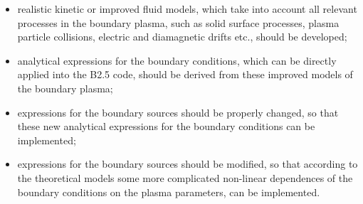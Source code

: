 \documentclass[11pt]{article}
\begin{document}
\begin{itemize}
\item  realistic kinetic or improved fluid models, which take into account
all relevant processes in the boundary plasma, such as solid surface
processes, plasma particle collisions, electric and diamagnetic drifts etc.,
should be developed;

\item  analytical expressions for the boundary conditions, which can be
directly applied into the B2.5 code, should be derived from these improved
models of the boundary plasma;

\item  expressions for the boundary sources should be properly changed, so
that these new analytical expressions for the boundary conditions can be
implemented;

\item  expressions for the boundary sources should be modified, so that
according to the theoretical models some more complicated non-linear
dependences of the boundary conditions on the plasma parameters, can be
implemented.
\end{itemize}

\bigskip

\bigskip
\end{document}
